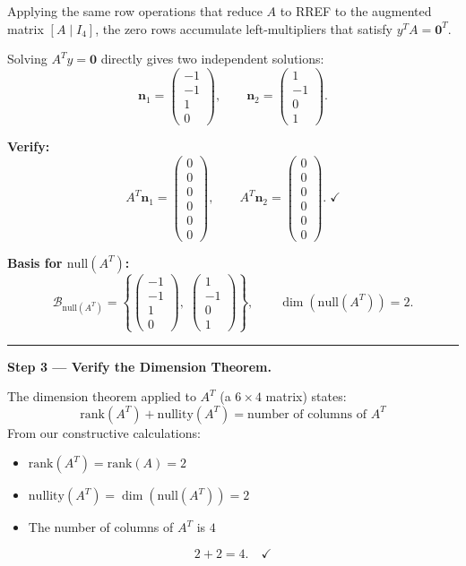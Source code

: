 \documentclass[12pt,a3paper]{article}
\begin{document}
\begin{tcolorbox}
Applying the same row operations that reduce $A$ to RREF to the augmented matrix $[A\mid I_4]$, the zero rows accumulate left-multipliers that satisfy $y^T A = \mathbf{0}^T$. 

Solving $A^Ty=\mathbf{0}$ directly gives two independent solutions:
\[
  \mathbf{n}_1=\begin{pmatrix}-1\\-1\\1\\0\end{pmatrix},\qquad
  \mathbf{n}_2=\begin{pmatrix}1\\-1\\0\\1\end{pmatrix}.
\]

\textbf{Verify:}
\[
  A^T\mathbf{n}_1=\begin{pmatrix}0\\0\\0\\0\\0\\0\end{pmatrix},\qquad
  A^T\mathbf{n}_2=\begin{pmatrix}0\\0\\0\\0\\0\\0\end{pmatrix}.\;\checkmark
\]

\textbf{Basis for $\mathrm{null}(A^T)$:}
\[
  \mathcal{B}_{\mathrm{null}(A^T)}=\left\{
  \begin{pmatrix}-1\\-1\\1\\0\end{pmatrix},\;
  \begin{pmatrix}1\\-1\\0\\1\end{pmatrix}
  \right\},\qquad \dim(\mathrm{null}(A^T)) = 2.
\]


\medskip\textcolor{cC}{\rule{\textwidth}{0.4pt}}

\textbf{Step 3 --- Verify the Dimension Theorem.}

The dimension theorem applied to $A^T$ (a $6 \times 4$ matrix) states:
\[
  \mathrm{rank}(A^T) + \mathrm{nullity}(A^T) = \text{number of columns of } A^T
\]
From our constructive calculations:
\begin{itemize}
  \item $\mathrm{rank}(A^T) = \mathrm{rank}(A) = 2$
  \item $\mathrm{nullity}(A^T) = \dim(\mathrm{null}(A^T)) = 2$
  \item The number of columns of $A^T$ is $4$
\end{itemize}
\[
  2 + 2 = 4.\quad\checkmark
\]


\end{tcolorbox}
\end{document}
